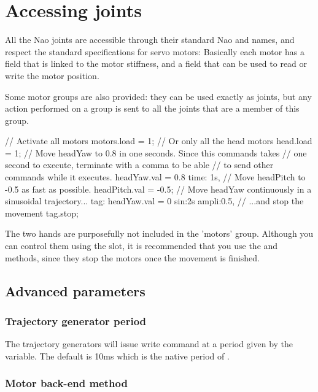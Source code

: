 \section{Accessing joints}
All the Nao joints are accessible through their standard Nao and \urbi names,
and respect the \urbi standard specifications for servo motors: Basically each
motor has a  field that is linked to the motor stiffness, and a
 field that can be used to read or write the motor position.

Some motor groups are also provided: they can be used exactly as joints,
but any action performed on a group is sent to all the joints that are a
member of this group.

\begin{urbiunchecked}
// Activate all motors
motors.load = 1;
// Or only all the head motors
head.load = 1;
// Move headYaw to 0.8 in one seconds. Since this commands takes
// one second to execute, terminate with a comma to be able
// to send other commands while it executes.
headYaw.val = 0.8 time: 1s,
// Move headPitch to -0.5 as fast as possible.
headPitch.val = -0.5;
// Move headYaw continuously in a sinusoidal trajectory...
tag: headYaw.val = 0 sin:2s ampli:0.5,
// ...and stop the movement
tag.stop;
\end{urbiunchecked}

The two hands are purposefully not included in the 'motors' group.
Although you can control them using the  slot, it is recommended that
you use the  and  methods, since they stop the motors
once the movement is finished.

\subsection{Advanced parameters}

\subsubsection{Trajectory generator period}

The trajectory generators will issue write command at a period given by the
 variable. The default is 10ms which is the native period
of \naoqi.

\subsubsection{Motor back-end method}


